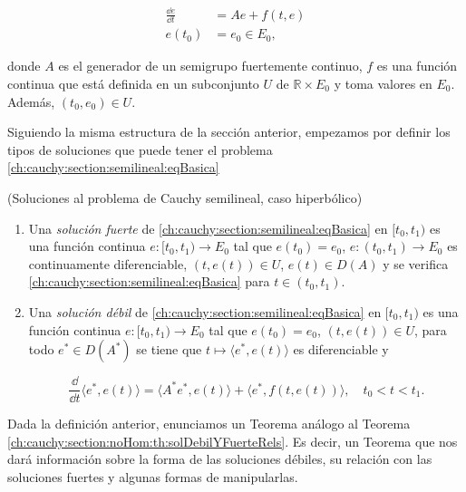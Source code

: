 \begin{align}
    \label{ch:cauchy:section:semilineal:eqBasica}
    \frac{\dd e}{\dd t} &= Ae + f(t,e)\\
    e(t_0) &= e_0 \in E_0,
\end{align}

donde $A$ es el generador de un semigrupo fuertemente continuo, $f$ es una función continua que está definida en un subconjunto $U$ de $\mathbb{R} \times E_0$ y toma valores en $E_0$. Además, $(t_0, e_0) \in U$.

Siguiendo la misma estructura de la sección anterior, empezamos por definir los tipos de soluciones que puede tener el problema \eqref{ch:cauchy:section:semilineal:eqBasica}\\

\begin{Definicion}{(Soluciones al problema de Cauchy semilineal, caso hiperbólico)}
    \label{ch:cauchy:section:semilineal:def:soluciones}

    \begin{enumerate}[label=\alph*)]
        \item Una \textit{solución fuerte} de \eqref{ch:cauchy:section:semilineal:eqBasica} en $[t_0, t_1)$ es una función continua $e : [t_0, t_1) \rightarrow E_0$ tal que $e(t_0) = e_0$, $e : (t_0, t_1) \rightarrow E_0$ es continuamente diferenciable, $(t, e(t)) \in U$, $e(t) \in D(A)$ y se verifica \eqref{ch:cauchy:section:semilineal:eqBasica} para $t \in (t_0, t_1)$. 

        \item Una \textit{solución débil} de \eqref{ch:cauchy:section:semilineal:eqBasica} en $[t_0, t_1)$ es una función continua $e : [t_0, t_1) \rightarrow E_0$ tal que $e(t_0) = e_0$, $(t, e(t)) \in U$, para todo $e^* \in D(A^*)$ se tiene que $t \mapsto \langle e^*, e(t) \rangle$ es diferenciable y 

        \[\frac{\dd}{\dd t}\langle e^*, e(t) \rangle = \langle A^* e^*, e(t) \rangle + \langle e^*, f(t, e(t)) \rangle, \quad t_0 < t < t_1.\]
    \end{enumerate}
\end{Definicion}

Dada la definición anterior, enunciamos un Teorema análogo al Teorema \eqref{ch:cauchy:section:noHom:th:solDebilYFuerteRels}. Es decir, un Teorema que nos dará información sobre la forma de las soluciones débiles, su relación con las soluciones fuertes y algunas formas de manipularlas.\\

